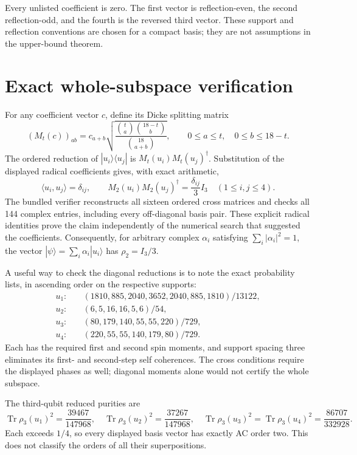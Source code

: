 \documentclass[11pt]{article}
\newcommand{\Tr}{\operatorname{Tr}}
\begin{document}
Every unlisted coefficient is zero. The first vector is reflection-even,
the second reflection-odd, and the fourth is the reversed third vector.
These support and reflection conventions are chosen for a compact basis;
they are not assumptions in the upper-bound theorem.

\section{Exact whole-subspace verification}
For any coefficient vector $c$, define its Dicke splitting matrix
\[
 (M_t(c))_{ab}=c_{a+b}
 \sqrt{\frac{\binom ta\binom{18-t}b}{\binom{18}{a+b}}},
 \qquad 0\le a\le t,\quad0\le b\le18-t.
\]
The ordered reduction of $|u_i\rangle\langle u_j|$ is
$M_t(u_i)M_t(u_j)^\dagger$. Substitution of the displayed radical
coefficients gives, with exact arithmetic,
\[
 \langle u_i,u_j\rangle=\delta_{ij},\qquad
 M_2(u_i)M_2(u_j)^\dagger=\frac{\delta_{ij}}3 I_3
 \quad(1\le i,j\le4).
\]
The bundled verifier reconstructs all sixteen ordered cross matrices and
checks all 144 complex entries, including every off-diagonal basis pair.
These explicit radical identities prove the claim independently of the
numerical search that suggested the coefficients.
Consequently, for arbitrary complex $\alpha_i$ satisfying
$\sum_i|\alpha_i|^2=1$, the vector
$|\psi\rangle=\sum_i\alpha_i|u_i\rangle$ has
$\rho_2=I_3/3$.

A useful way to check the diagonal reductions is to note the exact
probability lists, in ascending order on the respective supports:
\[
\begin{aligned}
 u_1:&\quad (1810,885,2040,3652,2040,885,1810)/13122,\\
 u_2:&\quad (6,5,16,16,5,6)/54,\\
 u_3:&\quad (80,179,140,55,55,220)/729,\\
 u_4:&\quad (220,55,55,140,179,80)/729.
\end{aligned}
\]
Each has the required first and second spin moments, and support spacing
three eliminates its first- and second-step self coherences. The cross
conditions require the displayed phases as well; diagonal moments alone
would not certify the whole subspace.

The third-qubit reduced purities are
\[
 \Tr\rho_3(u_1)^2=\frac{39467}{147968},\quad
 \Tr\rho_3(u_2)^2=\frac{37267}{147968},\quad
 \Tr\rho_3(u_3)^2=\Tr\rho_3(u_4)^2=\frac{86707}{332928}.
\]
Each exceeds $1/4$, so every displayed basis vector has exactly AC order
two. This does not classify the orders of all their superpositions.
\end{document}
